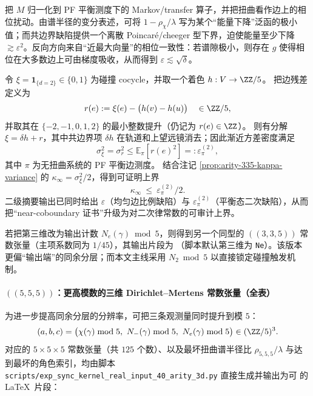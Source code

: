 \begin{remark}\label{rem:coboundary-defect-proof}
把 $M$ 归一化到 PF 平衡测度下的 Markov/transfer 算子，并把扭曲看作边上的相位扰动。由谱半径的变分表述，可将 $1-\rho_\chi/\lambda$ 写为某个“能量下降”泛函的极小值；而共边界缺陷提供一个离散 Poincar\'e/cheeger 型下界，迫使能量至少下降 \(\gtrsim \varepsilon^2\)。反向方向来自“近最大向量”的相位一致性：若谱隙极小，则存在 $g$ 使得相位在大多数边上可由梯度吸收，从而得到 \(\varepsilon\lesssim \sqrt{\delta}\)。
\end{remark}

\begin{remark}[从“最佳着色”得到的可证明上界：\texorpdfstring{$\kappa_\infty\le \varepsilon_\pi^{(2)}/2$}{kappa <= eps/2}]\label{rem:arity-335-eps-bound}
令 \(\xi=\mathbf{1}_{\{d=2\}}\in\{0,1\}\) 为碰撞 cocycle，并取一个着色 \(h:V\to\ZZ/5\)。
把边残差定义为
$$
r(e):=\xi(e)-\bigl(h(v)-h(u)\bigr)\quad\in\ZZ/5,
$$
并取其在 \(\{-2,-1,0,1,2\}\) 的最小整数提升（仍记为 \(r(e)\in\ZZ\)）。
则有分解 \(\xi=\delta h+r\)，其中共边界项 \(\delta h\) 在轨道和上望远镜消去；因此渐近方差密度满足
$$
\sigma_\xi^2=\sigma_r^2\le \mathbb{E}_\pi[r(e)^2]=:\varepsilon_\pi^{(2)},
$$
其中 \(\pi\) 为无扭曲系统的 PF 平衡边测度。
结合注记 \ref{prop:arity-335-kappa-variance} 的 \(\kappa_\infty=\sigma_\xi^2/2\)，得到可证明上界
$$
\kappa_\infty\ \le\ \varepsilon_\pi^{(2)}/2.
$$
二级摘要输出已同时给出 \(\varepsilon\)（均匀边比例缺陷）与 \(\varepsilon_\pi^{(2)}\)（平衡态二次缺陷），从而把“near-coboundary 证书”升级为对二次律常数的可审计上界。
\end{remark}

\begin{remark}\label{rem:arity-335-ne-mod5}
若把第三维改为输出计数 $N_e(\gamma)\bmod 5$，则得到另一个同型的 $((3,3,5))$ 常数张量（主项系数同为 $1/45$），其输出片段为
\verb||
（脚本默认第三维为 \texttt{Ne}）。该版本更偏“输出端”的同余分层；而本文主线采用 $N_2\bmod 5$ 以直接锁定碰撞触发机制。
\end{remark}

\paragraph{\texorpdfstring{$((5,5,5))$}{(5,5,5)}：更高模数的三维 Dirichlet--Mertens 常数张量（全表）}
为进一步提高同余分层的分辨率，可把三条观测量同时提升到模 $5$：
$$
(a,b,c)=\bigl(\chi(\gamma)\bmod 5,\ N_-(\gamma)\bmod 5,\ N_e(\gamma)\bmod 5\bigr)\in(\ZZ/5)^3.
$$
对应的 $5\times 5\times 5$ 常数张量（共 $125$ 个数）、以及最坏扭曲谱半径比 $\rho_{5,5,5}/\lambda$ 与达到最坏的角色索引，均由脚本
\texttt{scripts/exp\_sync\_kernel\_real\_input\_40\_arity\_3d.py}
直接生成并输出为可 \verb|| 的 \LaTeX\ 片段：


